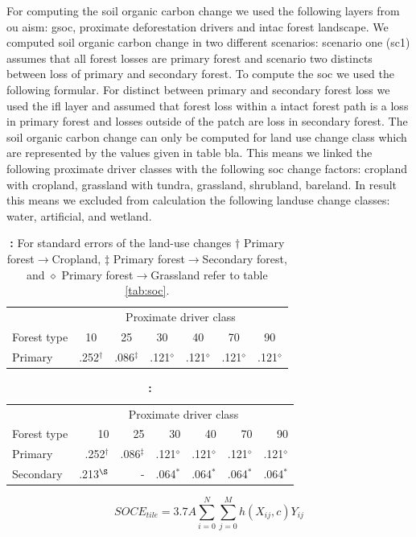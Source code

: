 		For computing the soil organic carbon change we used the following layers from ou aism: gsoc, proximate deforestation drivers and intac forest landscape. We computed soil organic carbon change in two different scenarios: scenario one (sc1) assumes that all forest losses are primary forest and scenario two distincts between loss of primary and secondary forest. To compute the soc we used the following formular. For distinct between primary and secondary forest loss we used the ifl layer and assumed that forest loss within a intact forest path is a loss in primary forest and losses outside of the patch are loss in secondary forest. The soil organic carbon change can only be computed for land use change class which are represented by the values given in table bla. This means we linked the following proximate driver classes with the following soc change factors: cropland with cropland, grassland with tundra, grassland, shrubland, bareland. In result this means we excluded from calculation the following landuse change classes: water, artificial, and wetland. 
		\begin{table}[ht]
			\centering
			\caption[Scenario 1]{\textbf{:} For standard errors of the land-use changes $\dagger$ Primary forest$\rightarrow$Cropland, $\ddagger$ Primary forest$\rightarrow$Secondary forest, and $\diamond$ Primary forest$\rightarrow$Grassland refer to table \ref{tab:soc}.}
			\label{tab:scenario1}
			\begin{tabular}{lcccccc}
				\hline
				& \multicolumn{6}{c}{Proximate driver class} \\
				Forest type & 10 & 25 & 30 & 40 & 70 & 90 \\
				\hline
				Primary & .252$^\mathbf{\dagger}$ & .086$^\mathbf{\ddagger}$ & .121$^\mathbf{\diamond}$ & .121$^\mathbf{\diamond}$ & .121$^\mathbf{\diamond}$ & .121$^\mathbf{\diamond}$ \\
				\hline
			\end{tabular}
		\end{table}
		\begin{table}[ht]
			\centering
			\caption[Scenario 2]{\textbf{:}}
			\label{tab:scenario2}
			\begin{tabular}{lrrrrrr}
				\hline
				& \multicolumn{6}{c}{Proximate driver class} \\
				Forest type & 10 & 25 & 30 & 40 & 70 & 90 \\
				\hline
				Primary & .252$^\mathbf{\dagger}$ & .086$^\mathbf{\ddagger}$ & .121$^\mathbf{\diamond}$ & .121$^\mathbf{\diamond}$ & .121$^\mathbf{\diamond}$ & .121$^\mathbf{\diamond}$ \\
				Secondary & .213$^\mathbf{\S}$ & - & .064$^\mathbf{*}$ & .064$^\mathbf{*}$ & .064$^\mathbf{*}$ & .064$^\mathbf{*}$\\
				\hline
			\end{tabular}
		\end{table}
		\begin{equation}
		\label{eq:SOC}
			SOCE_{tile} = 3.7A\displaystyle\sum_{i=0}^{N}\displaystyle\sum_{j=0}^{M} h(X_{ij}, c)Y_{ij}
		\end{equation}

